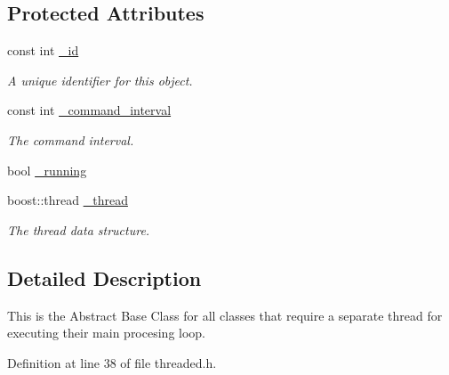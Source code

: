\subsection*{Protected Attributes}
\begin{DoxyCompactItemize}
\item 
\hypertarget{class_threaded_a87e8f1fa2f61c5c19a2db4efb42514f5}{
const int \hyperlink{class_threaded_a87e8f1fa2f61c5c19a2db4efb42514f5}{\_\-id}}
\label{class_threaded_a87e8f1fa2f61c5c19a2db4efb42514f5}

\begin{DoxyCompactList}\small\item\em A unique identifier for this object. \end{DoxyCompactList}\item 
\hypertarget{class_threaded_a64973538e05bdc59d7805934e1e71fb6}{
const int \hyperlink{class_threaded_a64973538e05bdc59d7805934e1e71fb6}{\_\-command\_\-interval}}
\label{class_threaded_a64973538e05bdc59d7805934e1e71fb6}

\begin{DoxyCompactList}\small\item\em The command interval. \end{DoxyCompactList}\item 
bool \hyperlink{class_threaded_a96b6bd60b0eb14d91ea26b1eac61064c}{\_\-running}
\item 
\hypertarget{class_threaded_a1b5743e4ff905449d292ab1017b0acaa}{
boost::thread \hyperlink{class_threaded_a1b5743e4ff905449d292ab1017b0acaa}{\_\-thread}}
\label{class_threaded_a1b5743e4ff905449d292ab1017b0acaa}

\begin{DoxyCompactList}\small\item\em The thread data structure. \end{DoxyCompactList}\end{DoxyCompactItemize}


\subsection{Detailed Description}
This is the Abstract Base Class for all classes that require a separate thread for executing their main procesing loop. 

Definition at line 38 of file threaded.h.




